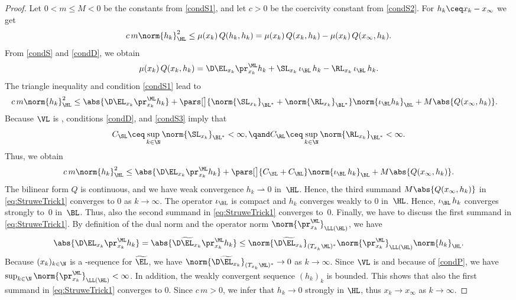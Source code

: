 \begin{proof}
	Let $0 < m \leq M < 0$ be the constants from \ref{condS1}, and let $c > 0$ be the coercivity constant from \ref{condS2}.
	For $h_k \ceq x_k - x_\infty$ we get
	\begin{equation}
		c \, m \norm{h_k}_\HL^2
		\leq 
		\mu(x_k) \, Q(h_k,h_k)
		=
		\mu(x_k) \, Q(x_k,h_k) - \mu(x_k) \, Q(x_\infty,h_k)
		.
		\label{eq:ExploitingCoercivity}
	\end{equation}
	From \ref{condS} and \ref{condD}, we obtain
	\[
		\mu(x_k) \, Q(x_k,h_k)
		=
		\D \EL_{x_k} \pr^\ML_{x_k} h_k
		+
		\SL_{x_k} \, \iota_\BL \, h_k
		-
		\RL_{x_k} \, \iota_\BL \, h_k
		.
	\]
	The triangle inequality and condition \ref{condS1} lead to
	\begin{align*}
		c \, m \norm{h_{k}}_\HL^2
		&\leq
		\abs{\D \EL_{x_k} \pr^\ML_{x_k} h_k}
		+
		\pars[\big]{
			\norm{\SL_{x_k}}_{\BL^*}
			+
			\norm{\RL_{x_k}}_{\BL^*} 
		} \norm{\iota_{\BL}h_k}_{\BL}
		+
		M \abs{Q(x_\infty,h_k)}
		.
	\end{align*}
	Because $\VL$ is \Econtrolled{\EL},
	conditions \ref{condD}, and \ref{condS3} imply that 
	\[
		C_\SL \ceq \sup_{k \in \N} \norm{\SL_{x_k}}_{\BL^*} < \infty 
		,
		\qand 
		C_\RL \ceq \sup_{k \in \N} \norm{\RL_{x_k}}_{\BL^*} < \infty 
		.
	\]
	Thus, we obtain
	\begin{equation}
		\label{eq:StruweTrick1}
		c \, m \norm{h_{k}}_\HL^2
		\leq
		\abs{\D \EL_{x_k} \pr^\ML_{x_k} h_k}
		+
		\pars[\big]{ C_\SL + C_\RL }
		\norm{\iota_\BL \, h_k}_{\BL}
		+
		M \abs{Q(x_\infty,h_k)}
		.
	\end{equation}
	The bilinear form $Q$ is continuous, and we have weak convergence $h_k \rightharpoonup 0$ in~$\HL$.
	Hence, the third summand $M\abs{Q(x_\infty,h_k)}$ in \cref{eq:StruweTrick1} converges to $0$ as $k \to \infty$.
	The operator $\iota_\BL$ is compact and $h_k$ converges weakly to $0$ in~$\HL$. 
	Hence, $\iota_\BL \, h_k$ converges strongly to~$0$ in~$\BL$.
	Thus, also the second summand in \cref{eq:StruweTrick1} converges to~$0$.
	Finally, we have to discuss the first summand in \cref{eq:StruweTrick1}.
	By definition of the dual norm and the operator norm $\norm{\pr^\ML_{x_k}}_{\LL(\HL)}$, we have
	\[
		\abs{\D \EL_{x_k} \pr^\ML_{x_k} h_k}
		=
		\abs{\D \widetilde{\EL}_{x_k} \pr^\ML_{x_k} h_k}
		\leq
		\norm{\D \widetilde{\EL}_{x_k}}_{(T_{x_k}\ML)^*}
		\norm{\pr^\ML_{x_k}}_{\LL(\HL)}
		\norm{h_k}_{\HL}
		.
	\]	
	Because $(x_k)_{k \in \N}$ is a \PaSma-sequence for $\widetilde{\EL}$, we have $\norm{\D \widetilde{\EL}_{x_k}}_{(T_{x_k} \ML)^*} \to 0$ as $k \to \infty$. 
	Since $\VL$ is \Econtrolled{\EL} and because of \ref{condP},
	we have $\sup_{k \in \N} \norm{\pr^\ML_{x_k}}_{\LL(\HL)} < \infty$. In addition, the weakly convergent sequence $ (h_k)_{k} $ is bounded.
	This shows that also the first summand in \cref{eq:StruweTrick1} converges to $0$. Since $c \, m > 0$, we infer that $h_k \to 0$ strongly in $\HL$, thus $x_k \to x_\infty$ as $k \to \infty$.
\end{proof}

